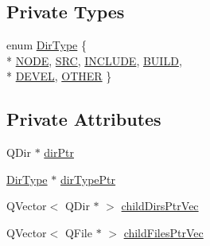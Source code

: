 \subsection*{Private Types}
\begin{DoxyCompactItemize}
\item 
enum \hyperlink{class_directory_a1c40bdd8c03ef51a29fa097c325fe345}{Dir\-Type} \{ \\*
\hyperlink{class_directory_a1c40bdd8c03ef51a29fa097c325fe345a032f30deac97c5bda25698f881b31b16}{N\-O\-D\-E}, 
\hyperlink{class_directory_a1c40bdd8c03ef51a29fa097c325fe345a04113739df8828cf617628d4409d246b}{S\-R\-C}, 
\hyperlink{class_directory_a1c40bdd8c03ef51a29fa097c325fe345a398cbd150a21421197b733b2a71620b4}{I\-N\-C\-L\-U\-D\-E}, 
\hyperlink{class_directory_a1c40bdd8c03ef51a29fa097c325fe345a5eadd6da197b9497d88d759f877d1a6e}{B\-U\-I\-L\-D}, 
\\*
\hyperlink{class_directory_a1c40bdd8c03ef51a29fa097c325fe345ae99347ac7c31d8d87215e88a3805d136}{D\-E\-V\-E\-L}, 
\hyperlink{class_directory_a1c40bdd8c03ef51a29fa097c325fe345af0bbf2abf7d54499e138b6a3448f05f8}{O\-T\-H\-E\-R}
 \}
\end{DoxyCompactItemize}
\subsection*{Private Attributes}
\begin{DoxyCompactItemize}
\item 
Q\-Dir $\ast$ \hyperlink{class_directory_ae8d40a5989c8fe90988aa9517cb87a9a}{dir\-Ptr}
\item 
\hyperlink{class_directory_a1c40bdd8c03ef51a29fa097c325fe345}{Dir\-Type} $\ast$ \hyperlink{class_directory_aeb912c1ed24b2bea1febce142fa3a57e}{dir\-Type\-Ptr}
\item 
Q\-Vector$<$ Q\-Dir $\ast$ $>$ \hyperlink{class_directory_a46f528b377bd9738da7c5a4ff9bb643e}{child\-Dirs\-Ptr\-Vec}
\item 
Q\-Vector$<$ Q\-File $\ast$ $>$ \hyperlink{class_directory_a3dcbd1171a1c28867b8c718bb0ecf5ff}{child\-Files\-Ptr\-Vec}
\end{DoxyCompactItemize}


